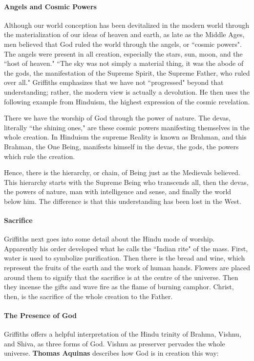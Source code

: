 \paragraph{Angels and Cosmic Powers}
Although our world conception has been devitalized in the modern world through the materialization of our ideas of heaven and earth, as late as the Middle Ages, men believed that God ruled the world through the angels, or ``cosmic powers". The angels were present in all creation, especially the stars, sun, moon, and the ``host of heaven." ``The sky was not simply a material thing, it was the abode of the gods, the manifestation of the Supreme Spirit, the Supreme Father, who ruled over all." Griffiths emphasizes that we have not ``progressed" beyond that understanding; rather, the modern view is actually a devolution. He then uses the following example from Hinduism, the highest expression of the cosmic revelation.

\begin{quotex}
There we have the worship of God through the power of nature. The devas, literally ``the shining ones," are these cosmic powers manifesting themselves in the whole creation. In Hinduism the supreme Reality is known as Brahman, and this Brahman, the One Being, manifests himself in the devas, the gods, the powers which rule the creation. 

\end{quotex}
Hence, there is the hierarchy, or chain, of Being just as the Medievals believed. This hierarchy starts with the Supreme Being who transcends all, then the devas, the powers of nature, man with intelligence and sense, and finally the world below him. The difference is that this understanding has been lost in the West.

\paragraph{Sacrifice}
Griffiths next goes into some detail about the Hindu mode of worship. Apparently his order developed what he calls the ``Indian rite" of the mass. First, water is used to symbolize purification. Then there is the bread and wine, which represent the fruits of the earth and the work of human hands. Flowers are placed around them to signify that the sacrifice is at the centre of the universe. Then they incense the gifts and wave fire as the flame of burning camphor. Christ, then, is the sacrifice of the whole creation to the Father.

\paragraph{The Presence of God}
Griffiths offers a helpful interpretation of the Hindu trinity of Brahma, Vishnu, and Shiva, as three forms of God. Vishnu as preserver pervades the whole universe. \textbf{Thomas Aquinas} describes how God is in creation this way:

